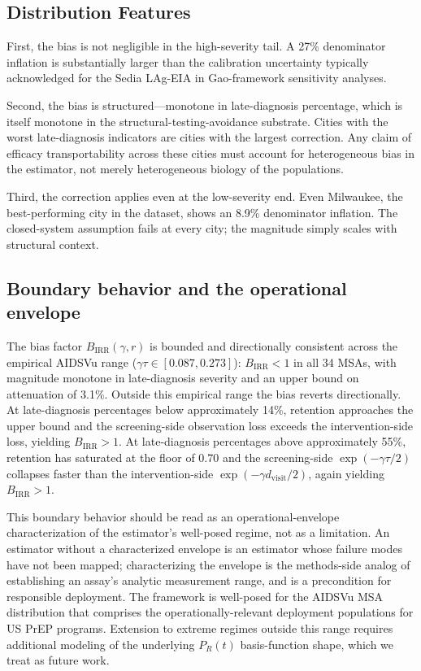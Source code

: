 \documentclass[12pt]{article}
\begin{document}
\subsection{Distribution Features}

First, the bias is not negligible in the high-severity tail. A 27\% denominator inflation is substantially larger than the calibration uncertainty typically acknowledged for the Sedia LAg-EIA in Gao-framework sensitivity analyses.

Second, the bias is structured---monotone in late-diagnosis percentage, which is itself monotone in the structural-testing-avoidance substrate. Cities with the worst late-diagnosis indicators are cities with the largest correction. Any claim of efficacy transportability across these cities must account for heterogeneous bias in the estimator, not merely heterogeneous biology of the populations.

Third, the correction applies even at the low-severity end. Even Milwaukee, the best-performing city in the dataset, shows an 8.9\% denominator inflation. The closed-system assumption fails at every city; the magnitude simply scales with structural context.

\subsection{Boundary behavior and the operational envelope}

The bias factor $B_{\mathrm{IRR}}(\gamma, r)$ is bounded and directionally consistent across the empirical AIDSVu range ($\gamma\tau \in [0.087, 0.273]$): $B_{\mathrm{IRR}} < 1$ in all 34 MSAs, with magnitude monotone in late-diagnosis severity and an upper bound on attenuation of 3.1\%. Outside this empirical range the bias reverts directionally. At late-diagnosis percentages below approximately 14\%, retention approaches the upper bound and the screening-side observation loss exceeds the intervention-side loss, yielding $B_{\mathrm{IRR}} > 1$. At late-diagnosis percentages above approximately 55\%, retention has saturated at the floor of 0.70 and the screening-side $\exp(-\gamma\tau/2)$ collapses faster than the intervention-side $\exp(-\gamma d_{\mathrm{visit}}/2)$, again yielding $B_{\mathrm{IRR}} > 1$.

This boundary behavior should be read as an operational-envelope characterization of the estimator's well-posed regime, not as a limitation. An estimator without a characterized envelope is an estimator whose failure modes have not been mapped; characterizing the envelope is the methods-side analog of establishing an assay's analytic measurement range, and is a precondition for responsible deployment. The framework is well-posed for the AIDSVu MSA distribution that comprises the operationally-relevant deployment populations for US PrEP programs. Extension to extreme regimes outside this range requires additional modeling of the underlying $P_R(t)$ basis-function shape, which we treat as future work.
\end{document}
